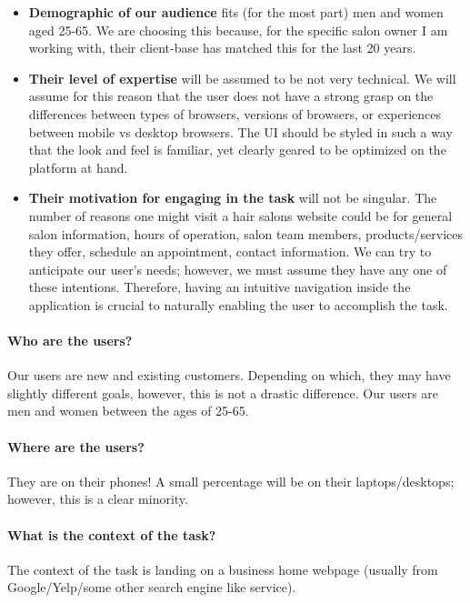 \begin{itemize}
\item
  \textbf{Demographic of our audience} fits (for the most part) men and women aged 25-65. We are choosing this because, for the specific salon owner I am working with, their client-base has matched this for the last 20 years.
\item
  \textbf{Their level of expertise} will be assumed to be not very technical. We will assume for this reason that the user does not have a strong grasp on the differences between types of browsers, versions of browsers, or experiences between mobile vs desktop browsers. The UI should be styled in such a way that the look and feel is familiar, yet clearly geared to be optimized on the platform at hand.
\item
  \textbf{Their motivation for engaging in the task} will not be singular. The number of reasons one might visit a hair salons website could be for general salon information, hours of operation, salon team members, products/services they offer, schedule an appointment, contact information. We can try to anticipate our user's needs; however, we must assume they have any one of these intentions. Therefore, having an intuitive navigation inside the application is crucial to naturally enabling the user to accomplish the task.
\end{itemize}

\paragraph{Who are the users?}
Our users are new and existing customers. Depending on which, they may have slightly different goals, however, this is not a drastic difference. Our users are men and women between the ages of 25-65.

\paragraph{Where are the users?}
They are on their phones! A small percentage will be on their laptops/desktops; however, this is a clear minority.

\paragraph{What is the context of the task?}
The context of the task is landing on a business home webpage (usually from Google/Yelp/some other search engine like service).

